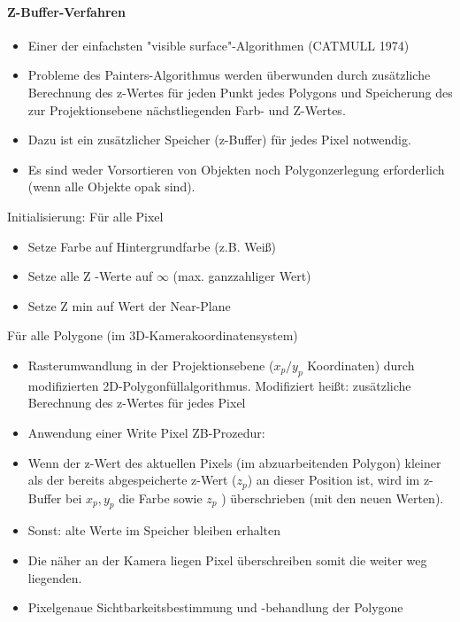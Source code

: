 \documentclass[10pt,landscape]{article}
\begin{document}
\begin{multicols}{3}
{  \paragraph{Z-Buffer-Verfahren}
  \begin{itemize}
    \item Einer der einfachsten "visible surface"-Algorithmen (CATMULL 1974)
    \item Probleme des Painters-Algorithmus werden überwunden durch zusätzliche Berechnung des z-Wertes für jeden Punkt jedes Polygons und Speicherung des zur Projektionsebene nächstliegenden Farb- und Z-Wertes.
    \item Dazu ist ein zusätzlicher Speicher (z-Buffer) für jedes Pixel notwendig.
    \item Es sind weder Vorsortieren von Objekten noch Polygonzerlegung erforderlich (wenn alle Objekte opak sind).
  \end{itemize}
  
  Initialisierung: Für alle Pixel
  \begin{itemize}
    \item Setze Farbe auf Hintergrundfarbe (z.B. Weiß)
    \item Setze alle Z -Werte auf $\infty$ (max. ganzzahliger Wert)
    \item Setze Z min auf Wert der Near-Plane
  \end{itemize}
  
  Für alle Polygone (im 3D-Kamerakoordinatensystem)
  \begin{itemize}
    \item Rasterumwandlung in der Projektionsebene ($x_p/y_p$ Koordinaten) durch modifizierten 2D-Polygonfüllalgorithmus. Modifiziert heißt: zusätzliche Berechnung des z-Wertes für jedes Pixel
    \item Anwendung einer Write Pixel ZB-Prozedur:
    \item Wenn der z-Wert des aktuellen Pixels (im abzuarbeitenden Polygon) kleiner als der bereits abgespeicherte z-Wert ($z_p$) an dieser Position ist, wird im z-Buffer bei $x_p , y_p$ die Farbe sowie $z_p$ ) überschrieben (mit den neuen Werten).
    \item Sonst: alte Werte im Speicher bleiben erhalten
    \item Die näher an der Kamera liegen Pixel überschreiben somit die weiter weg liegenden.
    \item Pixelgenaue Sichtbarkeitsbestimmung und -behandlung der Polygone
  \end{itemize}
  
}
\end{multicols}
\end{document}
